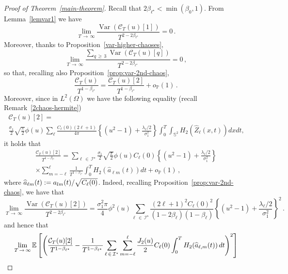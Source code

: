 \documentclass[AHL,Unicode,longabstracts,published]{cedram}
\newcommand{\clI}{\mathcal{I}}
\newcommand{\clC}{\mathcal{C}}
\newcommand{\bbS}{\mathbb{S}}
\newcommand{\bbP}{\mathbb{P}}
\DeclareMathOperator{\Var}{Var}
\let\oldhat\hat
\renewcommand*{\hat}[1]{\mathchoice{\widehat{#1}}{\widehat{#1}}{\oldhat{#1}}{\oldhat{#1}}}
\begin{document}
\begin{proof}[Proof of Theorem~\ref{main-theorem}]
Recall that $2\beta_{\ell^\star}<\min(\beta_0,1)$. From Lemma~\ref{lemvar1} we have
\[
\lim_{T\,\to\,\infty} \frac{\Var(\clC_T(u)[1])}{T^{2-2\beta_{\ell^\star}}} = 0\,.
\]
Moreover, thanks to Proposition~\ref{var-higher-chaoses},
\[
\lim_{T\,\to\,\infty} \frac{\sum_{q\,\ge\,3} \Var(\clC_T(u)[q])}{T^{2-2\beta_{\ell^\star}}} = 0\,,
\]
so that, recalling also Proposition~\ref{prop:var-2nd-chaos},
\begin{equation}\label{2chaosA}
\frac{\clC_T(u)}{T^{1-\beta_{\ell^\star}}}=\frac{\clC_T(u)[2]}{T^{1-\beta_{\ell^\star}}}+o_{\bbP}(1)\,.
\end{equation}
Moreover, since in $L^2(\Omega)$ we have the following equality (recall Remark~\ref{2chaos-hermite})
\begin{multline*}
\clC_T(u)[2]=\\
\frac{\sigma _{1}}{2}\sqrt{\frac{\pi }{2}}
\phi (u)\sum_{\ell} \frac{C_{\ell }(0)(2\ell +1)}{4\pi } \left\{\left(u^{2}-1\right)+\frac{\lambda _{\ell }/2}{
\sigma_{1}^{2}}\right\} \int_0^T\int_{\bbS^{2}}H_{2}\left(\widehat Z_{\ell}(x,t)\right)dxdt\text{,}
\end{multline*}
it holds that
\begin{multline} \label{eq:var2spectral}
\frac{\clC_T(u)[2]}{T^{1-\beta_{\ell^\star}}}=
\sum_{\ell\,\in\,\clI^\star} \frac{\sigma_1}{2}\sqrt{\frac\pi2} \phi(u) C_\ell(0) \left\{\left(u^{2}-1\right)+\frac{\lambda_{\ell}/2}{\sigma_{1}^{2}}\right\}\\
\times \sum_{m=-\ell}^{\ell} \frac{1}{T^{1-\beta_{\ell^\star}}}\int_{0}^T H_2\left(\widehat a_{\ell m}(t)\right)dt +o_{\bbP}(1)\,,
\end{multline}
where $\hat a_{\ell m}(t):= a_{l m}(t) / \sqrt{C_\ell(0)}$. Indeed, recalling Proposition~\ref{prop:var-2nd-chaos}, we have that
\begin{equation}\label{th21}
\lim_{T\,\rightarrow\,\infty }\frac{\Var\left(\clC_{T}(u)[2]\right) }{T^{2-2\beta_{\ell^{\star}}}} =\frac{
\sigma_{1}^{2}\pi }{4}\phi^{2}(u)\sum_{\ell\,\in\,\clI^\star}\frac{(2\ell+1)^{2}C_\ell(0)^2}{(1-2\beta_\ell)(1-\beta_\ell)}
\left\{\left(u^{2}-1\right)+\frac{\lambda _{\ell}/2}{\sigma_{1}^{2}}\right\}^2\,.
\end{equation}
and hence that
\begin{multline*}
\lim_{T\,\to\,\infty}\mathbb E\left[\left(\frac{\clC_T(u)[2]}{T^{1-\beta_{\ell^\star}}} -\frac{1}{T^{1-\beta_{\ell^\star}}}\sum_{\ell\,\in\,\clI^\star}\sum_{m=-\ell}^\ell \frac{J_2(u)}{2} C_\ell(0)\int_0^T H_2(\hat a_{\ell, m}(t))\, dt \right)^2\right]\\

\end{multline*}
\end{proof}
\end{document}
